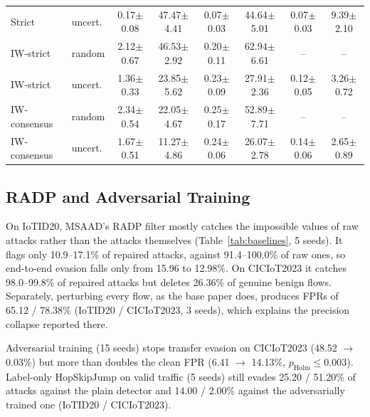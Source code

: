 \documentclass[conference]{IEEEtran}
\begin{document}
\begin{table}[t]
\begin{tabular}{@{}llcccccc@{}}
Strict & uncert. & 0.17$\pm$0.08 & 47.47$\pm$4.41 & 0.07$\pm$0.03 & 44.64$\pm$5.01 & 0.07$\pm$0.03 & 9.39$\pm$2.10 \\
IW-strict & random & 2.12$\pm$0.67 & 46.53$\pm$2.92 & 0.20$\pm$0.11 & 62.94$\pm$6.61 & -- & -- \\
IW-strict & uncert. & 1.36$\pm$0.33 & 23.85$\pm$5.62 & 0.23$\pm$0.09 & 27.91$\pm$2.36 & 0.12$\pm$0.05 & 3.26$\pm$0.72 \\
IW-consensus & random & 2.34$\pm$0.54 & 22.05$\pm$4.67 & 0.25$\pm$0.17 & 52.89$\pm$7.71 & -- & -- \\
IW-consensus & uncert. & 1.67$\pm$0.51 & 11.27$\pm$4.86 & 0.24$\pm$0.06 & 26.07$\pm$2.78 & 0.14$\pm$0.06 & 2.65$\pm$0.89 \\
\bottomrule
\end{tabular}
\end{table}

\subsection{RADP and Adversarial Training}
On IoTID20, MSAAD's RADP filter mostly catches the impossible values of raw
attacks rather than the attacks themselves (Table~\ref{tab:baselines}, 5
seeds). It flags only 10.9--17.1\% of repaired attacks, against 91.4--100.0\% of
raw ones, so end-to-end evasion falls only from 15.96 to 12.98\%. On
CICIoT2023 it catches 98.0--99.8\% of repaired attacks but deletes 26.36\% of
genuine benign flows. Separately, perturbing every flow, as the base paper
does, produces FPRs of 65.12 / 78.38\% (IoTID20 / CICIoT2023, 3 seeds), which
explains the precision collapse reported there.

Adversarial training (15 seeds) stops transfer evasion on CICIoT2023 (48.52
$\to$ 0.03\%) but more than doubles the clean FPR (6.41 $\to$ 14.13\%,
$p_{\text{Holm}} \le 0.003$). Label-only HopSkipJump on valid traffic (5 seeds)
still evades 25.20 / 51.20\% of attacks against the plain detector and 14.00 /
2.00\% against the adversarially trained one (IoTID20 / CICIoT2023).
\end{document}
